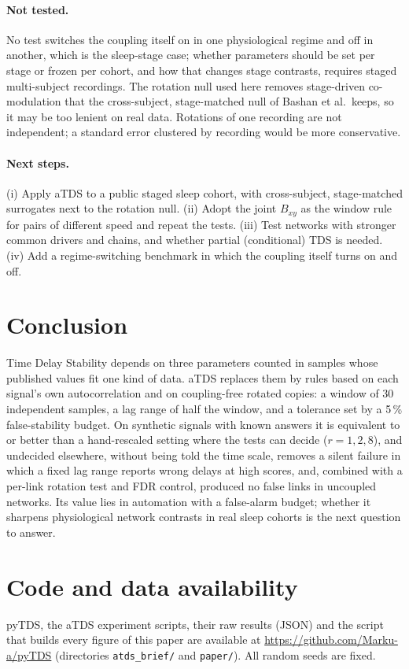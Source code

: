 \documentclass[11pt,a4paper]{article}
\begin{document}
\paragraph{Not tested.} No test switches the coupling itself on in one physiological regime and off in another, which is the sleep-stage case; whether parameters should be set per stage or frozen per cohort, and how that changes stage contrasts, requires staged multi-subject recordings. The rotation null used here removes stage-driven co-modulation that the cross-subject, stage-matched null of Bashan et al.\ keeps, so it may be too lenient on real data. Rotations of one recording are not independent; a standard error clustered by recording would be more conservative.

\paragraph{Next steps.} (i) Apply aTDS to a public staged sleep cohort, with cross-subject, stage-matched surrogates next to the rotation null. (ii) Adopt the joint $B_{xy}$ as the window rule for pairs of different speed and repeat the tests. (iii) Test networks with stronger common drivers and chains, and whether partial (conditional) TDS is needed. (iv) Add a regime-switching benchmark in which the coupling itself turns on and off.

\section{Conclusion}
\label{sec:conclusion}
Time Delay Stability depends on three parameters counted in samples whose published values fit one kind of data. aTDS replaces them by rules based on each signal's own autocorrelation and on coupling-free rotated copies: a window of 30 independent samples, a lag range of half the window, and a tolerance set by a 5\,\% false-stability budget. On synthetic signals with known answers it is equivalent to or better than a hand-rescaled setting where the tests can decide ($r = 1, 2, 8$), and undecided elsewhere, without being told the time scale, removes a silent failure in which a fixed lag range reports wrong delays at high scores, and, combined with a per-link rotation test and FDR control, produced no false links in uncoupled networks. Its value lies in automation with a false-alarm budget; whether it sharpens physiological network contrasts in real sleep cohorts is the next question to answer.

\section*{Code and data availability}
\label{sec:availability}
pyTDS, the aTDS experiment scripts, their raw results (JSON) and the script that builds every figure of this paper are available at \url{https://github.com/Marku-a/pyTDS} (directories \texttt{atds\_brief/} and \texttt{paper/}). All random seeds are fixed.
\end{document}
